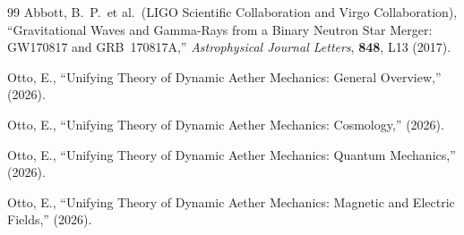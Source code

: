 ﻿\documentclass[12pt,letterpaper]{article}
\begin{document}
\begin{thebibliography}{99}
Abbott, B.~P.\ et al.\ (LIGO Scientific Collaboration and Virgo Collaboration),
``Gravitational Waves and Gamma-Rays from a Binary Neutron Star Merger: GW170817 and GRB~170817A,''
\textit{Astrophysical Journal Letters}, \textbf{848}, L13 (2017).

Otto, E.,
``Unifying Theory of Dynamic Aether Mechanics: General Overview,''
(2026).

Otto, E.,
``Unifying Theory of Dynamic Aether Mechanics: Cosmology,''
(2026).

Otto, E.,
``Unifying Theory of Dynamic Aether Mechanics: Quantum Mechanics,''
(2026).

Otto, E.,
``Unifying Theory of Dynamic Aether Mechanics: Magnetic and Electric Fields,''
(2026).
\end{thebibliography}
\end{document}
